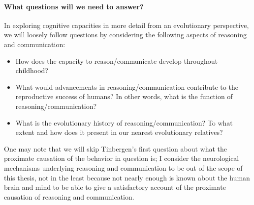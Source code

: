 \paragraph{What questions will we need to answer?}
In exploring cognitive capacities in more detail from an evolutionary perspective, we will loosely follow  questions by considering the following aspects of reasoning and communication:
\begin{itemize}
    \item How does the capacity to reason/communicate develop throughout childhood?
    \item What would advancements in reasoning/communication contribute to the reproductive success of humans? In other words, what is the function of reasoning/communication?
    \item What is the evolutionary history of reasoning/communication? To what extent and how does it present in our nearest evolutionary relatives?
\end{itemize}
One may note that we will skip Tinbergen's first question about what the proximate causation of the behavior in question is; I consider the neurological mechanisms underlying reasoning and communication to be out of the scope of this thesis, not in the least because not nearly enough is known about the human brain and mind to be able to give a satisfactory account of the proximate causation of reasoning and communication.
